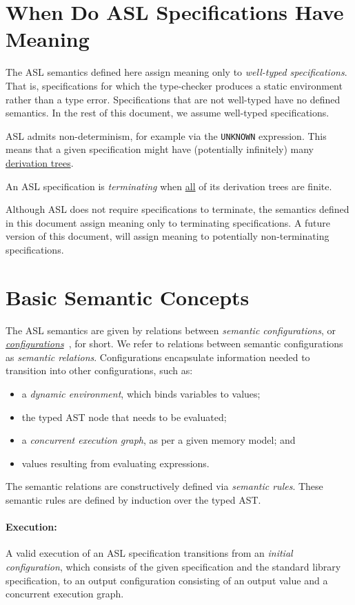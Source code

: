 \documentclass{book}
\begin{document}
\section{When Do ASL Specifications Have Meaning \label{sec:MeaningfulASLSpecifications}}
The ASL semantics defined here assign meaning only to \emph{well-typed specifications}.
That is, specifications for which the type-checker produces a static environment rather than
a type error.
Specifications that are not well-typed have no defined semantics.
In the rest of this document, we assume well-typed specifications.

ASL admits non-determinism, for example via the \texttt{UNKNOWN} expression.
This means that a given specification might have (potentially infinitely) many
\hyperlink{def-derivationtree}{derivation trees}.

An ASL specification is \emph{terminating} when \underline{all} of its derivation trees are finite.

Although ASL does not require specifications to terminate, the semantics defined in this
document assign meaning only to terminating specifications.
A future version of this document, will assign meaning to potentially non-terminating specifications.

\section{Basic Semantic Concepts}
The ASL semantics are given by relations between \emph{semantic configurations},
or \hyperlink{def-configuration}{\emph{configurations}}~\cite{SemanticsWithApplicationsBook}, for short.
We refer to relations between semantic configurations as \emph{semantic relations}.
Configurations encapsulate information needed to transition into other configurations, such as:
\begin{itemize}
  \item a \emph{dynamic environment}, which binds variables to values;
  \item the typed AST node that needs to be evaluated;
  \item a \emph{concurrent execution graph}, as per a given memory model; and
  \item values resulting from evaluating expressions.
\end{itemize}
The semantic relations are constructively defined via \emph{semantic rules}.
These semantic rules are defined by induction over the typed AST.

\paragraph{Execution:}
A valid execution of an ASL specification transitions from an \emph{initial configuration},
which consists of the given specification and the standard library specification, to an output configuration
consisting of an output value and a concurrent execution graph.
\end{document}
